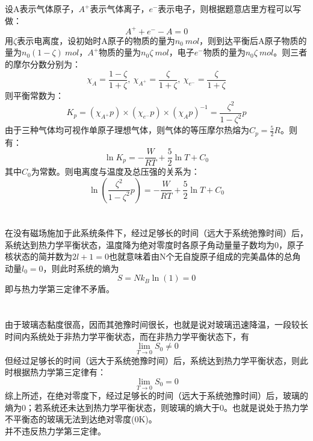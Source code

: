 \documentclass[a4paper,12pt]{article}
\begin{document}
\section{}
设A表示气体原子，$A^+$表示气体离子，$e^-$表示电子，则根据题意店里方程可以写做：
\begin{equation}\nonumber
	A^+ + e^- - A = 0
\end{equation}
用$\zeta$表示电离度，设初始时A原子的物质的量为$n_0 ~mol$，则到达平衡后A原子物质的量为$n_0(1-\zeta) ~mol$，$A^+$物质的量为$n_0\zeta ~mol$，电子$e^-$物质的量为$n_0\zeta ~mol$。则三者的摩尔分数分别为：
\begin{equation}\nonumber
	\chi_{A} = \frac{1-\zeta}{1+\zeta},~\chi_{A^+} = \frac{\zeta}{1+\zeta},~\chi_{e^-} = \frac{\zeta}{1+\zeta}
\end{equation}
则平衡常数为：
\begin{equation}\nonumber
	K_p = (\chi_{A^+}p) \times (\chi_{e^-}p) \times (\chi_{A}p)^{-1} = \frac{\zeta^2}{1-\zeta^2} p
\end{equation}
由于三种气体均可视作单原子理想气体，则气体的等压摩尔热熔为$C_p = \frac{5}{2}R$。则有：
\begin{equation}\nonumber
	\ln K_p = -\frac{W}{RT} + \frac{5}{2}\ln T + C_0
\end{equation}
其中$C_0$为常数。则电离度与温度及总压强的关系为：
\begin{equation}\nonumber
	\ln\left( \frac{\zeta^2}{1-\zeta^2} p \right) = -\frac{W}{RT} + \frac{5}{2}\ln T + C_0
\end{equation}


\section{}
在没有磁场施加于此系统条件下，经过足够长的时间（远大于系统弛豫时间）后，系统达到热力学平衡状态，温度降为绝对零度时各原子角动量量子数均为0，原子核状态的简并数为$2l+1 = 0$也就意味着由N个无自旋原子组成的完美晶体的总角动量$l_0=0$，则此时系统的熵为
\begin{equation}\nonumber
	S = Nk_B \ln(1) = 0
\end{equation}
即与热力学第三定律不矛盾。


\section{}
由于玻璃态黏度很高，因而其弛豫时间很长，也就是说对玻璃迅速降温，一段较长时间内系统处于非热力学平衡状态，而在非热力学平衡状态下，有
\begin{equation}\nonumber
	\lim_{T\to 0} S_0 \neq 0
\end{equation}
但经过足够长的时间（远大于系统弛豫时间）后，系统达到热力学平衡状态，则此时根据热力学第三定律有：
\begin{equation}\nonumber
	\lim_{T\to 0} S_0 = 0
\end{equation}
综上所述，在绝对零度下，经过足够长的时间（远大于系统弛豫时间）后，玻璃的熵为0；若系统还未达到热力学平衡状态，则玻璃的熵大于0。也就是说处于热力学不平衡态的玻璃无法到达绝对零度(0K)。 \\
并不违反热力学第三定律。
\end{document}
